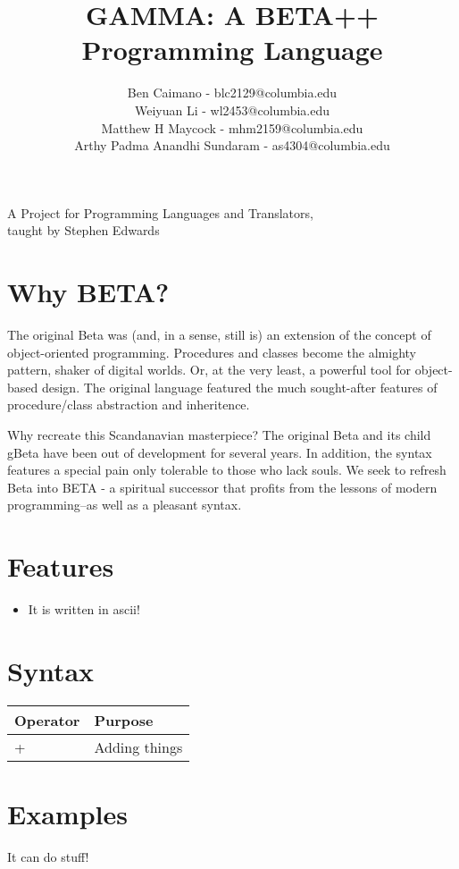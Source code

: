 \documentclass[10pt]{article}
\title{GAMMA: A BETA++ Programming Language}
\author{
	Ben Caimano - blc2129@columbia.edu \\
	Weiyuan Li - wl2453@columbia.edu \\
	Matthew H Maycock - mhm2159@columbia.edu \\
	Arthy Padma Anandhi Sundaram - as4304@columbia.edu
}
\date{}
\begin{document}
\maketitle
\begin{center}
\large
A Project for Programming Languages and Translators,
\\taught by Stephen Edwards
\end{center}


\section*{Why BETA?}
The original Beta was (and, in a sense, still is) an extension of the
concept of object-oriented programming. Procedures and classes become the
almighty pattern, shaker of digital worlds. Or, at the very least, a
powerful tool for object-based design. The original language featured the
much sought-after features of procedure/class abstraction and inheritence.

Why recreate this Scandanavian masterpiece? The original Beta and its
child gBeta have been out of development for several years. In addition,
the syntax features a special pain only tolerable to those who lack souls.
We seek to refresh Beta into BETA - a spiritual successor that profits
from the lessons of modern programming--as well as a pleasant syntax.

\section*{Features}
\begin{itemize}
\item It is written in ascii!
\end{itemize}

\section*{Syntax}
\begin{center}
\begin{tabular}{|p{}|p{}|}
\hline
Operator & Purpose\\ \hline
+ & Adding things\\ \hline
\end{tabular}
\end{center}

\section*{Examples}
It can do stuff!
\end{document}

